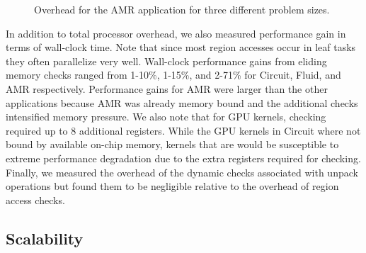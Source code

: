 \begin{figure}
\begin{center}
{\label{fig:amr8192}
}
\end{center}
\vspace{-2mm}
\caption{Overhead for the AMR application for three different problem sizes.\label{fig:amr_overhead}}
\vspace{-6mm}
\end{figure}

In addition to total processor overhead, we also measured performance gain in terms of wall-clock
time.  Note that since most region accesses occur in leaf tasks they often parallelize
very well.  Wall-clock performance gains from eliding memory checks ranged from 1-10\%, 1-15\%, 
and 2-71\% for Circuit, Fluid, and AMR respectively.  Performance gains for AMR were larger than
the other applications because AMR was already memory bound and the additional checks intensified
memory pressure.  We also note that for GPU kernels, checking required up to 8 additional registers.  
While the GPU kernels in Circuit where not bound by 
available on-chip memory, kernels that are would be susceptible to extreme performance 
degradation due to the extra registers required for checking.  Finally, we measured the overhead
of the dynamic checks associated with unpack operations but found them to be negligible relative
to the overhead of region access checks.

\subsection{Scalability}
\label{subsec:scalability}

